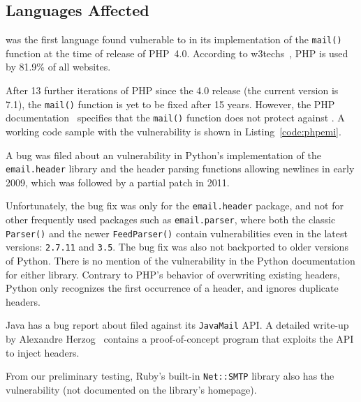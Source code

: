 \subsection{Languages Affected}
\label{languages}
 was the first language found vulnerable to \ehi in its implementation of the \texttt{mail()} function at the time of release of PHP~4.0. According to w3techs~\cite{W3techs}, PHP is used by 81.9\% of all websites.

After 13 further iterations of PHP since the 4.0 release (the current
version is 7.1), the \texttt{mail()} function is yet to be fixed after
15 years. However, the PHP documentation~\cite{PHPDocs} specifies that the \texttt{mail()} function does not protect against \ehi.
A working code sample with the vulnerability is shown in  Listing~\ref{code:phpemi}.

\begin{sloppypar}
A bug was filed about an \ehi vulnerability in Python's implementation of the \texttt{email.header} library and the header parsing functions allowing newlines in early 2009, which was followed by a partial patch in 2011.
\end{sloppypar}

Unfortunately, the bug fix was only for the \texttt{email.header} package, and not for other frequently used packages such as \texttt{email.parser}, where both the classic \texttt{Parser()} and the newer \texttt{FeedParser()} contain \ehi vulnerabilities even in the latest versions: \texttt{2.7.11} and \texttt{3.5}. The bug fix was also not backported to older versions of Python.
There is no mention of the vulnerability in the Python documentation for either library. Contrary to PHP's behavior of overwriting existing headers, Python only recognizes the first occurrence of a header, and ignores duplicate headers.


%

Java has a bug report about \ehi filed against its \texttt{JavaMail} API. A detailed write-up by Alexandre Herzog~\cite{Herzog.2014} contains a proof-of-concept program that exploits the API to inject headers.

From our preliminary testing, Ruby's built-in \texttt{Net::SMTP} library also has the vulnerability (not documented on the library's homepage).
%


